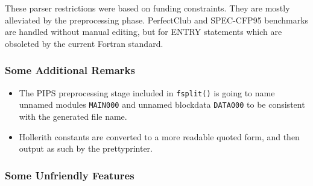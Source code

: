 \documentclass[a4paper]{report}
\begin{document}
These parser restrictions were based on funding constraints. They are
mostly alleviated by the preprocessing phase. PerfectClub and SPEC-CFP95
benchmarks are handled without manual editing, but for ENTRY statements
which are obsoleted by the current Fortran standard.


\subsubsection{Some Additional Remarks}

\begin{itemize}
\item The PIPS preprocessing stage included in \texttt{fsplit()} is going
  to name unnamed modules \texttt{MAIN000} and unnamed  blockdata
  \texttt{DATA000} to be consistent with the generated file name.

\item Hollerith constants are converted to a more readable quoted form,
  and then output as such by the prettyprinter.

\end{itemize}

\subsubsection{Some Unfriendly Features}
\end{document}
